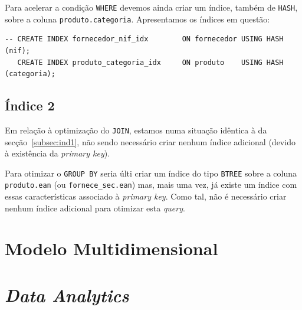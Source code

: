\documentclass[a4paper]{article}
\begin{document}
    Para acelerar a condição \lstinline{WHERE} devemos ainda criar um índice, também de \lstinline{HASH}, sobre
    a coluna \lstinline{produto.categoria}. Apresentamos os índices em questão:

    \begin{lstlisting}
-- CREATE INDEX fornecedor_nif_idx        ON fornecedor USING HASH (nif);
   CREATE INDEX produto_categoria_idx     ON produto    USING HASH  (categoria);
    \end{lstlisting}

    \subsection{Índice 2}
    Em relação à optimização do \lstinline{JOIN}, estamos numa situação idêntica à da secção~\ref{subsec:ind1}, não
    sendo necessário criar nenhum índice adicional (devido à existência da \textit{primary key}).


    Para otimizar o \lstinline{GROUP BY} seria últi criar um índice do tipo \lstinline{BTREE} sobre a coluna
    \lstinline{produto.ean} (ou \lstinline{fornece_sec.ean}) mas, mais uma vez, já existe um índice com essas
    características associado à \textit{primary key}. Como tal, não é necessário criar nenhum índice adicional
    para otimizar esta \textit{query}.

    \section{Modelo Multidimensional}
    

    \section{\textit{Data Analytics}}
\end{document}
